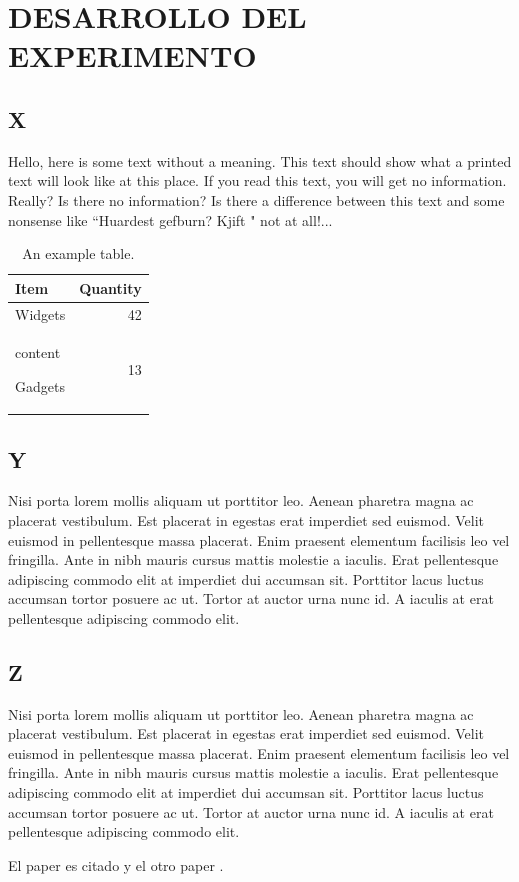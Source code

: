 \chapter{DESARROLLO DEL EXPERIMENTO}
\section{X}

Hello, here is some text without a meaning.  This text should 
show what a printed text will look like at this place.  If you 
read this text, you will get no information.  Really?  Is there 
no information?  Is there a difference between this text and some 
nonsense like ``Huardest gefburn?  Kjift " not at all!...

\begin{table}
\centering
\begin{tabular}{l|r}
Item & Quantity \\\hline
Widgets & 42 \\\begin{environment-name}
content
\end{environment-name}
Gadgets & 13
\end{tabular}
\caption{\label{tab:widgets1}An example table.}
\end{table}

\section{Y}

Nisi porta lorem mollis aliquam ut porttitor leo. Aenean pharetra magna ac placerat vestibulum. Est placerat in egestas erat imperdiet sed euismod. Velit euismod in pellentesque massa placerat. Enim praesent elementum facilisis leo vel fringilla. Ante in nibh mauris cursus mattis molestie a iaculis. Erat pellentesque adipiscing commodo elit at imperdiet dui accumsan sit. Porttitor lacus luctus accumsan tortor posuere ac ut. Tortor at auctor urna nunc id. A iaculis at erat pellentesque adipiscing commodo elit. 


\section{Z}

Nisi porta lorem mollis aliquam ut porttitor leo. Aenean pharetra magna ac placerat vestibulum. Est placerat in egestas erat imperdiet sed euismod. Velit euismod in pellentesque massa placerat. Enim praesent elementum facilisis leo vel fringilla. Ante in nibh mauris cursus mattis molestie a iaculis. Erat pellentesque adipiscing commodo elit at imperdiet dui accumsan sit. Porttitor lacus luctus accumsan tortor posuere ac ut. Tortor at auctor urna nunc id. A iaculis at erat pellentesque adipiscing commodo elit. 

El paper es citado  y el otro paper .
